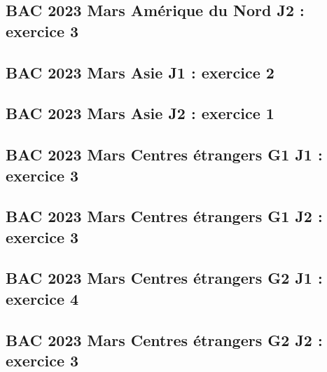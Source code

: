 \documentclass[lang=fr,edition=teacher,layout=sheet]{mxbook}
\begin{document}
\begingroup\endgroup
\par\bigskip
{}\subsection*{BAC 2023 Mars Amérique du Nord J2 : exercice 3}
\begingroup\endgroup
\par\bigskip
{}\subsection*{BAC 2023 Mars Asie J1 : exercice 2}
\begingroup\endgroup
\par\bigskip
{}\subsection*{BAC 2023 Mars Asie J2 : exercice 1}
\begingroup\endgroup
\par\bigskip
{}\subsection*{BAC 2023 Mars Centres étrangers G1 J1 : exercice 3}
\begingroup\endgroup
\par\bigskip
{}\subsection*{BAC 2023 Mars Centres étrangers G1 J2 : exercice 3}
\begingroup\endgroup
\par\bigskip
{}\subsection*{BAC 2023 Mars Centres étrangers G2 J1 : exercice 4}
\begingroup\endgroup
\par\bigskip
{}\subsection*{BAC 2023 Mars Centres étrangers G2 J2 : exercice 3}
\end{document}
